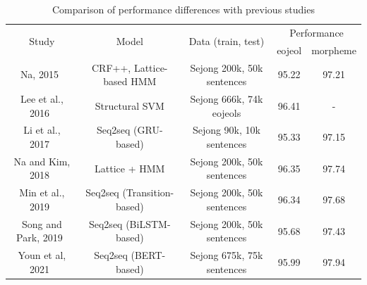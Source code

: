 \documentclass[AMS,STIX2COL]{WileyNJD-v2}
\begin{document}
    \begin{table}[ht]
        \caption{Comparison of performance differences with previous studies}
        \label{tab:differences-with-previous-studies}
        \begin{tabular*}{500pt}{@{\extracolsep\fill}ccc|cc@{\extracolsep\fill}}
            \toprule
            \multirow{2}{*}{Study}                & \multirow{2}{*}{Model}                          & \multirow{2}{*}{Data (train, test)}         & \multicolumn{2}{c}{Performance}                           \\
            \cmidrule{4-5}
            ~                                     & ~                                               & ~                                           & \multicolumn{1}{c}{eojeol} & \multicolumn{1}{c}{morpheme} \\
            \midrule
            Na, 2015~\cite{NaSH2015}              & CRF++, Lattice-based HMM                        & Sejong 200k, 50k sentences                  & 95.22                      & 97.21                        \\
            Lee et al., 2016~\cite{LeeCH2016}     & Structural SVM                                  & Sejong 666k, 74k eojeols                    & 96.41                      & -                            \\
            Li et al., 2017~\cite{Li2017}         & Seq2seq (GRU-based)                             & Sejong 90k, 10k sentences                   & 95.33                      & 97.15                        \\
            Na and Kim, 2018~\cite{NaSH2018}      & Lattice + HMM                                   & Sejong 200k, 50k sentences                  & 96.35                      & 97.74                        \\
            Min et al., 2019~\cite{MinJW2019}     & Seq2seq (Transition-based)                      & Sejong 200k, 50k sentences                  & 96.34                      & 97.68                        \\
            Song and Park, 2019~\cite{SongHJ2019} & Seq2seq (BiLSTM-based)                          & Sejong 200k, 50k sentences                  & 95.68                      & 97.43                        \\
            Youn et al, 2021~\cite{YounJY2021}    & Seq2seq (BERT-based)                            & Sejong 675k, 75k sentences                  & 95.99                      & 97.94                        \\

\end{tabular*}
\end{table}
\end{document}
